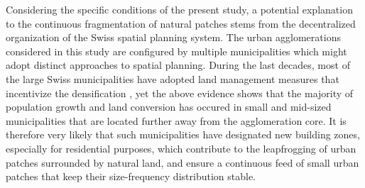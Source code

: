 \documentclass[10pt,letterpaper]{article}
\begin{document}
Considering the specific conditions of the present study, a potential explanation to the continuous fragmentation of natural patches stems from the decentralized organization of the Swiss spatial planning system.
The urban agglomerations considered in this study are configured by multiple municipalities which might adopt distinct approaches to spatial planning.
During the last decades, most of the large Swiss municipalities have adopted land management measures that incentivize the densification \cite{rudolf2018planning}, yet the above evidence shows that the majority of population growth and land conversion has occured in small and mid-sized municipalities that are located further away from the agglomeration core.
It is therefore very likely that such municipalities have designated new building zones, especially for residential purposes, which contribute to the leapfrogging of urban patches surrounded by natural land, and ensure a continuous feed of small urban patches that keep their size-frequency distribution stable.
\end{document}
